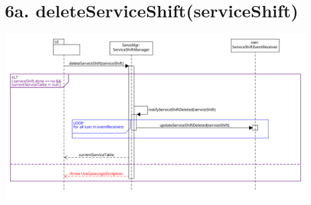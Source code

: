 \section*{6a. deleteServiceShift(serviceShift)}

\begin{center}
  \includegraphics[scale = 0.28]{images/DSD/Esame DSD 6a.png}
\end{center}
\pagebreak
